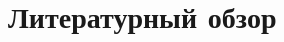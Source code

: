 \documentclass[../diploma.tex]{subfile}
\begin{document}
    \section{Литературный обзор}\label{ch:litreview}
\end{document}
